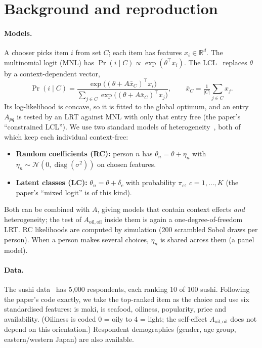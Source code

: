 \documentclass[11pt,a4paper]{article}
\theoremstyle{remark}
\newcommand{\xb}{\bar{x}}
\newcommand{\Aoo}{A_{\mathrm{oil,oil}}}
\begin{document}
\section{Background and reproduction}
\label{sec:background}

\paragraph{Models.}
A chooser picks item $i$ from set $C$; each item has features $x_i\in\mathbb{R}^d$. The multinomial
logit (MNL) has $\Pr(i\mid C)\propto\exp(\theta^\top x_i)$. The LCL~\cite{tb21} replaces $\theta$ by a
context-dependent vector,
\begin{equation}
\Pr(i\mid C)=\frac{\exp\big((\theta+A\xb_C)^\top x_i\big)}{\sum_{j\in C}\exp\big((\theta+A\xb_C)^\top x_j\big)},
\qquad \xb_C=\tfrac{1}{|C|}\textstyle\sum_{j\in C}x_j .
\label{eq:lcl}
\end{equation}
Its log-likelihood is concave, so it is fitted to the global optimum, and an entry $A_{pq}$ is tested by
an LRT against MNL with only that entry free (the paper's ``constrained LCL''). We use two standard
models of heterogeneity~\cite{train09}, both of which keep each individual context-free:
\begin{itemize}
\item \textbf{Random coefficients (RC):} person $n$ has $\theta_n=\theta+\eta_n$ with
      $\eta_n\sim\mathcal{N}(0,\operatorname{diag}(\sigma^2))$ on chosen features.
\item \textbf{Latent classes (LC):} $\theta_n=\theta+\delta_c$ with probability $\pi_c$, $c=1,\dots,K$
      (the paper's ``mixed logit'' is of this kind).
\end{itemize}
Both can be combined with $A$, giving models that contain context effects \emph{and} heterogeneity; the
test of $\Aoo$ inside them is again a one-degree-of-freedom LRT. RC likelihoods are computed by simulation
(200 scrambled Sobol draws per person). When a person makes several choices, $\eta_n$ is shared across
them (a panel model).

\paragraph{Data.}
The sushi data~\cite{kamishima03} has 5{,}000 respondents, each ranking 10 of 100 sushi. Following the
paper's code exactly, we take the top-ranked item as the choice and use six standardised features: is maki,
is seafood, oiliness, popularity, price and availability. (Oiliness is coded 0 = oily to 4 = light; the
self-effect $\Aoo$ does not depend on this orientation.) Respondent demographics (gender, age group,
eastern/western Japan) are also available.
\end{document}
